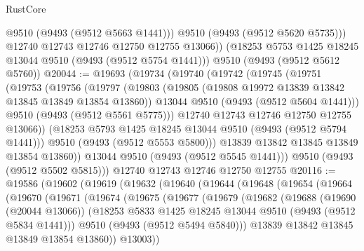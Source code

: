 \begin{lexlean}{RustCore}
\begin{coremodule}
            @9510
            (@9493 (@9512 @5663 @1441)))
          @9510
          (@9493 (@9512 @5620 @5735)))
        @12740
        @12743
        @12746
        @12750
        @12755
        @13066))
    (@18253 @5753 @1425 @18245 @13044 @9510 (@9493 (@9512 @5754 @1441)))
    @9510
    (@9493 (@9512 @5612 @5760))
@20044 := @19693
    (@19734
      (@19740
        (@19742
          (@19745
            (@19751
              (@19753
                (@19756
                  (@19797
                    (@19803
                      (@19805 (@19808 @19972 @13839 @13842 @13845 @13849 @13854 @13860))
                      @13044
                      @9510
                      (@9493 (@9512 @5604 @1441)))
                    @9510
                    (@9493 (@9512 @5561 @5775)))
                  @12740
                  @12743
                  @12746
                  @12750
                  @12755
                  @13066))
              (@18253 @5793 @1425 @18245 @13044 @9510 (@9493 (@9512 @5794 @1441)))
              @9510
              (@9493 (@9512 @5553 @5800)))
            @13839
            @13842
            @13845
            @13849
            @13854
            @13860))
        @13044
        @9510
        (@9493 (@9512 @5545 @1441)))
      @9510
      (@9493 (@9512 @5502 @5815)))
    @12740
    @12743
    @12746
    @12750
    @12755
@20116 := @19586
    (@19602
      (@19619
        (@19632
          (@19640
            (@19644
              (@19648
                (@19654
                  (@19664
                    (@19670
                      (@19671
                        (@19674
                          (@19675
                            (@19677
                              (@19679
                                (@19682
                                  (@19688
                                    (@19690 (@20044 @13066))
                                    (@18253
                                      @5833
                                      @1425
                                      @18245
                                      @13044
                                      @9510
                                      (@9493 (@9512 @5834 @1441)))
                                    @9510
                                    (@9493 (@9512 @5494 @5840)))
                                  @13839
                                  @13842
                                  @13845
                                  @13849
                                  @13854
                                  @13860))
                              @13003))

\end{coremodule}
\end{lexlean}
